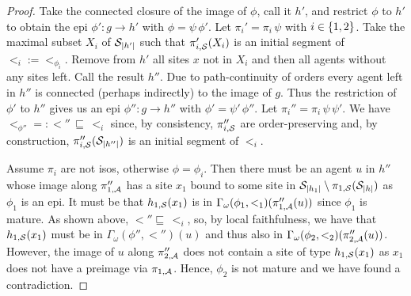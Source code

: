 \documentclass[a4paper,12pt]{article}
\newcommand{\anon}[1]{\left|#1\right|}
\newcommand{\gp}{\Gamma}
\newcommand{\ord}{\omega}
\newcommand{\ogp}{\gp_\ord}
\begin{document}
\begin{proof}
  Take the connected closure of the image of $\phi$,
  call it $h'$, and restrict $\phi$ to $h'$ to obtain
  the epi $\phi': g \to h'$ with $\phi = \psi\,\phi'$.
  Let $\pi_i' = \pi_i\,\psi$ with $i \in \left\{ 1,2 \right\}$.
  Take the maximal subset $X_i$ of $\sites_{\anon{h'}}$
  such that $\pi_{i,\mathcal{S}}'(X_i)$ is an initial segment
  of $<_i := <_{\phi_i}$.
  Remove from $h'$ all sites $x$ not in $X_i$
  and then all agents without any sites left.
  Call the result $h''$.
  Due to path-continuity of orders
  every agent left in $h''$ is connected
  (perhaps indirectly) to the image of $g$.
  Thus the restriction of $\phi'$ to $h''$
  gives us an epi $\phi'': g \to h''$
  with $\phi' = \psi'\,\phi''$.
  Let $\pi_i'' = \pi_i\,\psi\,\psi'$.
  We have $<_{\phi''} =: {<''} \,\sqsubseteq\, <_i$
  since, by consistency,
  $\pi_{i,\mathcal{S}}''$ are order-preserving
  and, by construction,
  $\pi_{i,\sites}''(\sites_{\anon{h''}})$
  is an initial segment of $<_i$.

  Assume $\pi_i$ are not isos,
  otherwise $\phi = \phi_i$.
  Then there must be an agent $u$ in $h''$
  whose image along $\pi_{1,\mathcal{A}}''$
  has a site $x_1$ bound to some site in
  $\sites_{\anon{h_1}} \setminus \pi_{1,\sites}(\sites_{\anon{h}})$
  as $\phi_1$ is an epi.
  It must be that $h_{1,\mathcal{S}}(x_1)$ is in
  $\ogp(\phi_1,{<_1})(\pi_{1,\agents}''(u))$
  since $\phi_1$ is mature.
  As shown above, ${<''} \sqsubseteq\, <_i$,
  so, by local faithfulness, we have that
  $h_{1,\mathcal{S}}(x_1)$ must be in $\ogp(\phi'',{<''})(u)$
  and thus also in $\ogp(\phi_2,{<_2})(\pi_{2,\agents}''(u))$.
  However,
  the image of $u$ along $\pi_{2,\mathcal{A}}''$ does not contain
  a site of type $h_{1,\mathcal{S}}(x_1)$
  as $x_1$ does not have a preimage via $\pi_{1,\mathcal{A}}$.
  Hence, $\phi_2$ is not mature
  and we have found a contradiction.
\end{proof}
\end{document}
